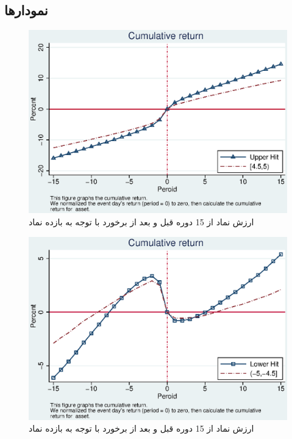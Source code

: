 \documentclass[12pt]{article}
\begin{document}
\restoregeometry


\linespread{1.4}
\begin{appendices}

\section{نمودار‌ها}
\label{sa1.1}

\begin{figure}[htbp]
\centering
\includegraphics[width=0.8\columnwidth]{CUR.eps}
\caption{ارزش نماد از 15 دوره قبل  و بعد از برخورد  با توجه به بازده نماد }
\label{g13}
\end{figure}

\begin{figure}[htbp]
\centering
\includegraphics[width=0.8\columnwidth]{CLR.eps}
\caption{ارزش نماد از 15 دوره قبل  و بعد از برخورد  با توجه به بازده نماد }
\label{g14}
\end{figure}



\end{appendices}
\end{document}
